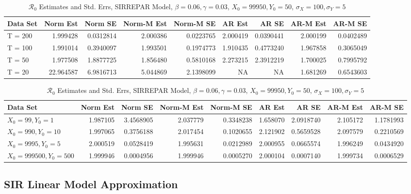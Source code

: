\documentclass[12pt]{article}
\newcommand{\rr}{\ensuremath{\mathcal{R}_0}}
\begin{document}
\begin{table}[H]
	
	\caption{\label{tab:}$\rr$ Estimates and Std. Errs, SIRREPAR Model,
		$\beta = 0.06, \gamma = 0.03$, $X_0 = 99950, Y_0 = 50$, $\sigma_X = 100, \sigma_Y = 5$}
	\centering
	\begin{tabular}[t]{l|r|r|r|r|r|r|r|r}
		\hline
		Data Set & Norm Est & Norm SE & Norm-M Est & Norm-M SE & AR Est & AR SE & AR-M Est & AR-M SE\\
		\hline
		T = 200 & 1.999428 & 0.0312814 & 2.000386 & 0.0223765 & 2.000419 & 0.0390441 & 2.000199 & 0.0402489\\
		\hline
		T = 100 & 1.991014 & 0.3940097 & 1.993501 & 0.1974773 & 1.910435 & 0.4773240 & 1.967858 & 0.3065049\\
		\hline
		T = 50 & 1.977508 & 1.8877725 & 1.856480 & 0.5810168 & 2.273215 & 2.3912219 & 1.700025 & 0.7995792\\
		\hline
		T = 20 & 22.964587 & 6.9816713 & 5.044869 & 2.1398099 & NA & NA & 1.681269 & 0.6543603\\
		\hline
	\end{tabular}
\end{table}

\begin{table}[H]
	
	\caption{\label{tab:}$\rr$ Estimates and Std. Errs, SIRREPAR Model,
		$\beta = 0.06, \gamma = 0.03$, $X_0 = 99950, Y_0 = 50$, $\sigma_X = 100, \sigma_Y = 5$}
	\centering
	\begin{tabular}[t]{l|r|r|r|r|r|r|r|r}
		\hline
		Data Set & Norm Est & Norm SE & Norm-M Est & Norm-M SE & AR Est & AR SE & AR-M Est & AR-M SE\\
		\hline
		$X_0 = 99, Y_0 = 1$ & 1.987105 & 3.4568905 & 2.037779 & 0.3348238 & 1.658070 & 2.0918740 & 2.105172 & 1.1781993\\
		\hline
		$X_0 = 990, Y_0 = 10$ & 1.997065 & 0.3756188 & 2.017454 & 0.1020655 & 2.121902 & 0.5659528 & 2.097579 & 0.2210569\\
		\hline
		$X_0 = 9995, Y_0 = 5$ & 2.000519 & 0.0528419 & 1.995631 & 0.0212989 & 2.000955 & 0.0665574 & 1.996249 & 0.0434920\\
		\hline
		$X_0 = 999500, Y_0 = 500$ & 1.999946 & 0.0004956 & 1.999946 & 0.0005270 & 2.000104 & 0.0007140 & 1.999734 & 0.0006529\\
		\hline
	\end{tabular}
\end{table}

\subsection{SIR Linear Model Approximation}
\end{document}
